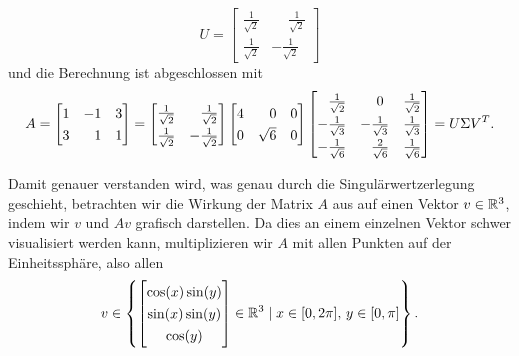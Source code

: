 \begin{example}
\begin{equation*}
        U =
        \begin{bmatrix}
            \frac{1}{\sqrt{2}} & \phantom{-}\frac{1}{\sqrt{2}} \\
            \frac{1}{\sqrt{2}} & -\frac{1}{\sqrt{2}}
        \end{bmatrix}
    \end{equation*}
    und die Berechnung ist abgeschlossen mit
    \begin{equation*}
        A =
        \begin{bmatrix}
            1 & -1 & 3 \\
            3 & \phantom{-}1 & 1
        \end{bmatrix}
        =
        \begingroup
        \renewcommand{\arraystretch}{1.3}
        \begin{bmatrix}
            \frac{1}{\sqrt{2}} & \phantom{-}\frac{1}{\sqrt{2}} \\
            \frac{1}{\sqrt{2}} & -\frac{1}{\sqrt{2}}
        \end{bmatrix}
        \endgroup
        \begin{bmatrix}
            4 & \phantom{\surd}0 & 0 \\
            0 & \sqrt{6} & 0
        \end{bmatrix}
        \begingroup
        \renewcommand{\arraystretch}{1.3}
        \begin{bmatrix}
            \phantom{-}\frac{1}{\sqrt{2}} & \phantom{-}0 & \frac{1}{\sqrt{2}} \\
            -\frac{1}{\sqrt{3}} & -\frac{1}{\sqrt{3}} & \frac{1}{\sqrt{3}} \\
            -\frac{1}{\sqrt{6}} & \phantom{-}\frac{2}{\sqrt{6}} & \frac{1}{\sqrt{6}} \\
        \end{bmatrix}
        \endgroup
        =
        U \Sigma V^{T}.
    \end{equation*}
\end{example}
Damit genauer verstanden wird, was genau durch die Singulärwertzerlegung geschieht, betrachten wir die Wirkung der Matrix \(A\) aus  auf einen Vektor \(v \in \mathbb{R}^{3}\), indem wir \(v\) und \(Av\) grafisch darstellen.  
Da dies an einem einzelnen Vektor schwer visualisiert werden kann, multiplizieren wir \(A\) mit allen Punkten auf der Einheitssphäre, also allen 
\begin{equation*}
    v \in 
    \left\{
    \begin{bmatrix}
        \cos(x)\sin(y) \\ \sin(x)\sin(y) \\ \cos(y)
    \end{bmatrix}
    \in \R^{3}
    \mid
    x \in [0, 2\pi], \, y \in [0, \pi]
    \right\}.
\end{equation*}
